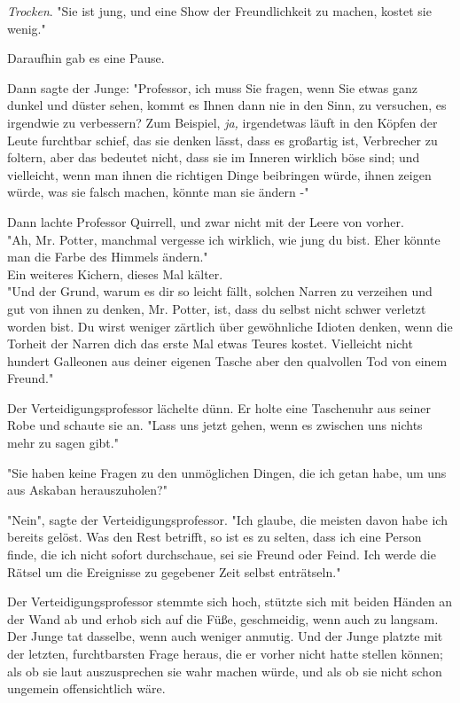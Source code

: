 {\emph{Trocken}. "Sie ist jung, und eine Show der Freundlichkeit zu machen, kostet sie wenig."

Daraufhin gab es eine Pause.

Dann sagte der Junge: "Professor, ich muss Sie fragen, wenn Sie etwas ganz dunkel und düster sehen, kommt es Ihnen dann nie in den Sinn, zu versuchen, es irgendwie zu verbessern? Zum Beispiel, \emph{ja,} irgendetwas läuft in den Köpfen der Leute furchtbar schief, das sie denken lässt, dass es großartig ist, Verbrecher zu foltern, aber das bedeutet nicht, dass sie im Inneren wirklich böse sind; und vielleicht, wenn man ihnen die richtigen Dinge beibringen würde, ihnen zeigen würde, was sie falsch machen, könnte man sie ändern -"

Dann lachte Professor Quirrell, und zwar nicht mit der Leere von vorher.\\ "Ah, Mr. Potter, manchmal vergesse ich wirklich, wie jung du bist. Eher könnte man die Farbe des Himmels ändern."\\ Ein weiteres Kichern, dieses Mal kälter.\\ "Und der Grund, warum es dir so leicht fällt, solchen Narren zu verzeihen und gut von ihnen zu denken, Mr. Potter, ist, dass du selbst nicht schwer verletzt worden bist. Du wirst weniger zärtlich über gewöhnliche Idioten denken, wenn die Torheit der Narren dich das erste Mal etwas Teures kostet. Vielleicht nicht hundert Galleonen aus deiner eigenen Tasche aber den qualvollen Tod von einem Freund."

Der Verteidigungsprofessor lächelte dünn. Er holte eine Taschenuhr aus seiner Robe und schaute sie an. "Lass uns jetzt gehen, wenn es zwischen uns nichts mehr zu sagen gibt."

"Sie haben keine Fragen zu den unmöglichen Dingen, die ich getan habe, um uns aus Askaban herauszuholen?"

"Nein", sagte der Verteidigungsprofessor. "Ich glaube, die meisten davon habe ich bereits gelöst. Was den Rest betrifft, so ist es zu selten, dass ich eine Person finde, die ich nicht sofort durchschaue, sei sie Freund oder Feind. Ich werde die Rätsel um die Ereignisse zu gegebener Zeit selbst enträtseln."

Der Verteidigungsprofessor stemmte sich hoch, stützte sich mit beiden Händen an der Wand ab und erhob sich auf die Füße, geschmeidig, wenn auch zu langsam. Der Junge tat dasselbe, wenn auch weniger anmutig. Und der Junge platzte mit der letzten, furchtbarsten Frage heraus, die er vorher nicht hatte stellen können; als ob sie laut auszusprechen sie wahr machen würde, und als ob sie nicht schon ungemein offensichtlich wäre.

}
